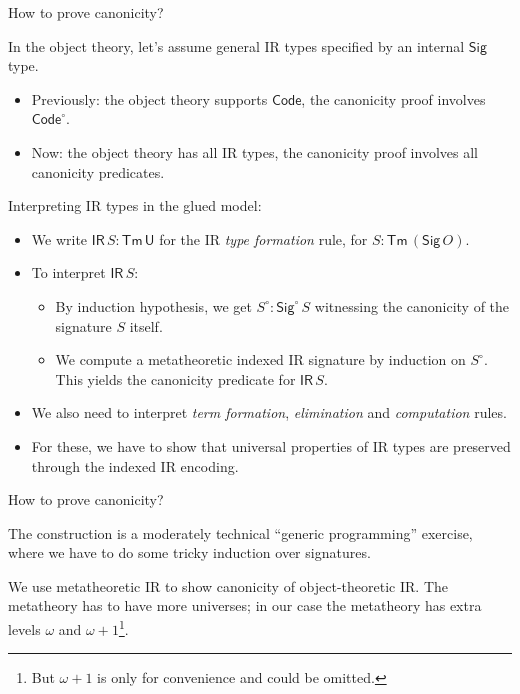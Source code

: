 \documentclass[dvipsnames,aspectratio=169]{beamer}
\newcommand{\ms}[1]{\mathsf{#1}}
\newcommand{\U}{\ms{U}}
\newcommand{\Sig}{\ms{Sig}}
\newcommand{\Code}{\ms{Code}}
\newcommand{\IR}{\ms{IR}}
\newcommand{\Tm}{\ms{Tm}}
\newcommand{\w}{\circ}
\begin{document}
\begin{frame}{How to prove canonicity?}

In the object theory, let's assume general IR types specified by an internal $\Sig$ type.
\begin{itemize}
\item Previously: the object theory supports $\Code$, the canonicity proof involves $\Code^\w$.
\item Now: the object theory has all IR types, the canonicity proof involves all canonicity predicates.
\end{itemize}
\vspace{1em}
\pause

Interpreting IR types in the glued model:
\begin{itemize}
 \item We write $\IR\,S : \Tm\,\U$ for the IR \emph{type formation} rule, for $S : \Tm\,(\Sig\,O)$.
 \pause
 \item To interpret $\IR\,S$:
   \begin{itemize}
     \item By induction hypothesis, we get $S^\w : \Sig^\w\,S$ witnessing the canonicity of the
       signature $S$ itself.
     \item We compute a metatheoretic indexed IR signature by induction on $S^\w$.
       This yields the canonicity predicate for $\IR\,S$.
   \end{itemize}
 \pause
 \item We also need to interpret \emph{term formation}, \emph{elimination} and \emph{computation} rules.
 \item For these, we have to show that universal properties of IR types are
       preserved through the indexed IR encoding.
\end{itemize}
\vspace{1em}
\end{frame}


\begin{frame}{How to prove canonicity?}

The construction is a moderately technical ``generic programming'' exercise,
where we have to do some tricky induction over signatures.
\vspace{1em}

We use metatheoretic IR to show canonicity of object-theoretic IR.  The metatheory has
to have more universes; in our case the metatheory has extra levels $\omega$ and $\omega+1$\footnote{But $\omega+1$ is only for convenience and could be omitted.}.

\end{frame}
\end{document}
